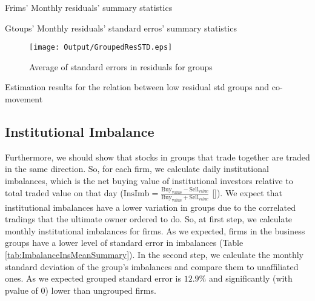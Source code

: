{			\begin{table}[htbp]
	\centering
	\caption{Frims' Monthly residuals' summary statistics}
	\label{tab:ResidualTrunSummary}
	\resizebox{0.8\textwidth}{!}{
		
	}
\end{table}	
		\begin{table}[htbp]
			\centering
			\caption{Gtoups' Monthly residuals' standard erros' summary statistics}
			\label{tab:ResidualTrunStdSummary}
			\resizebox{0.8\textwidth}{!}{
				
			}
		\end{table}
\begin{figure}[htbp]
	\centering
	\texttt{[image: Output/GroupedResSTD.eps]}

	\caption{Average of standard errors in residuals for groups}
	\label{fig:GroupedResSTD}
\end{figure}
		\begin{table}[htbp]
			\centering
			\caption{Estimation results for the relation between low residual std groups and co-movement}
			\label{Turnovercrosssection}
			\resizebox{\textwidth}{!}{
				\centering
				
			}			
		\end{table}}




\FloatBarrier

%
%
\subsection{{Institutional Imbalance}}

	Furthermore, we should show that stocks in groups that trade together are traded in the same direction. So, for each firm, we calculate daily institutional imbalances, which is the net buying value of institutional investors relative to total traded value on that day ($ \text{InsImb} = \frac{\text{Buy}_{\text{value}} - \text{Sell}_{\text{value}}}{\text{Buy}_{\text{value}} + \text{Sell}_{\text{value}}} $ [\cite{seasholes2007predictable}]).
	We expect that institutional imbalances have a lower variation in groups due to the correlated tradings that the ultimate owner ordered to do. So, at first step, we calculate monthly institutional imbalances for firms. As we expected, firms in the business groups have a lower level of standard error in  imbalances (Table \ref{tab:ImbalanceInsMeanSummary}). In the second step, 	 we calculate the monthly standard deviation of the group's imbalances and compare them to unaffiliated ones. As we expected grouped standard error is  $12.9\%$ and significantly (with pvalue of 0) lower than ungrouped firms. 
	
